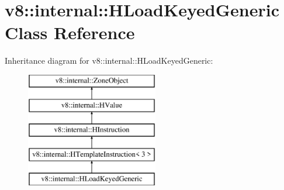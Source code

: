 \hypertarget{classv8_1_1internal_1_1_h_load_keyed_generic}{}\section{v8\+:\+:internal\+:\+:H\+Load\+Keyed\+Generic Class Reference}
\label{classv8_1_1internal_1_1_h_load_keyed_generic}
Inheritance diagram for v8\+:\+:internal\+:\+:H\+Load\+Keyed\+Generic\+:\begin{figure}[H]
\begin{center}
\leavevmode
\includegraphics[height=5.000000cm]{classv8_1_1internal_1_1_h_load_keyed_generic}
\end{center}
\end{figure}
